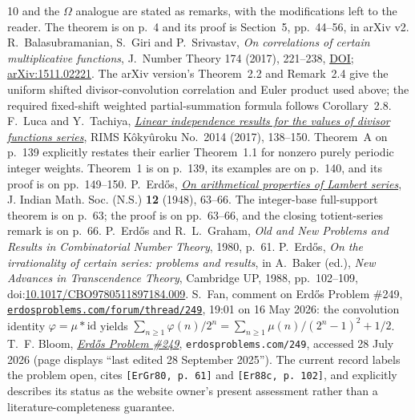 \documentclass[11pt]{article}
\begin{document}
\begin{thebibliography}{10}
  and the $\Omega$ analogue are stated as remarks, with the modifications left
  to the reader.  The theorem is on p.~4 and its proof is Section~5,
  pp.~44--56, in arXiv v2.
 R.~Balasubramanian, S.~Giri and P.~Srivastav,
  \emph{On correlations of certain multiplicative functions},
  J.\ Number Theory 174 (2017), 221--238,
  \href{https://doi.org/10.1016/j.jnt.2016.10.001}{DOI};
  \href{https://arxiv.org/abs/1511.02221}{arXiv:1511.02221}.
  The arXiv version's Theorem~2.2 and Remark~2.4 give the uniform shifted
  divisor-convolution correlation and Euler product used above; the required
  fixed-shift weighted partial-summation formula follows Corollary~2.8.
 F.~Luca and Y.~Tachiya,
  \href{https://www.kurims.kyoto-u.ac.jp/~kyodo/kokyuroku/contents/pdf/2014-14.pdf}
  {\emph{Linear independence results for the values of divisor functions
  series}}, RIMS K\^oky\^uroku No.~2014 (2017), 138--150.
  Theorem~A on p.~139 explicitly restates their earlier Theorem~1.1 for
  nonzero purely periodic integer weights.  Theorem~1 is on p.~139, its
  examples are on p.~140, and its proof is on pp.~149--150.
 P.~Erd\H{o}s,
  \href{https://users.renyi.hu/~p_erdos/1948-04.pdf}
  {\emph{On arithmetical properties of Lambert series}},
  J. Indian Math. Soc. (N.S.) \textbf{12} (1948), 63--66.
  The integer-base full-support theorem is on p.~63; the proof is on
  pp.~63--66, and the closing totient-series remark is on p.~66.
 P.~Erd\H{o}s and R.~L.~Graham, \emph{Old and New
  Problems and Results in Combinatorial Number Theory}, 1980, p.~61.
 P.~Erd\H{o}s, \emph{On the irrationality of certain
  series: problems and results}, in A.~Baker (ed.), \emph{New Advances in
  Transcendence Theory}, Cambridge UP, 1988, pp.~102--109,
  doi:\href{https://doi.org/10.1017/CBO9780511897184.009}
  {10.1017/CBO9780511897184.009}.
 S.~Fan, comment on Erd\H{o}s Problem \#249,
  \href{https://www.erdosproblems.com/forum/thread/249}{\texttt{erdosproblems.com/forum/thread/249}},
  19:01 on 16 May 2026: the convolution identity $\varphi=\mu*\mathrm{id}$
  yields $\sum_{n\ge1}\varphi(n)/2^n=\sum_{n\ge1}\mu(n)/(2^n-1)^2+1/2$.
 T.~F. Bloom,
  \href{https://www.erdosproblems.com/249}{\emph{Erd\H{o}s Problem \#249}},
  \texttt{erdosproblems.com/249}, accessed 28 July 2026 (page displays
  ``last edited 28 September 2025'').  The current record labels the problem
  open, cites \texttt{[ErGr80, p.~61]} and \texttt{[Er88c, p.~102]}, and
  explicitly describes its status as the website owner's present assessment
  rather than a literature-completeness guarantee.
\end{thebibliography}
\end{document}
